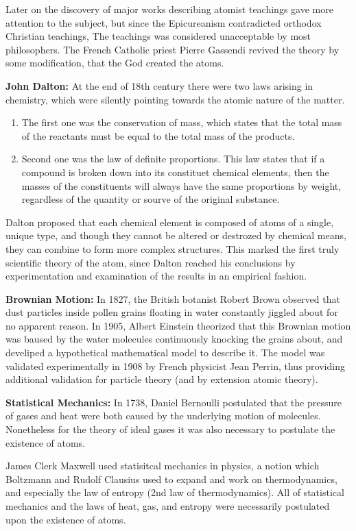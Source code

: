 \documentclass[10pt,a4paper]{article}
\newcounter{theo}
\begin{document}
Later on the discovery of major works describing atomist teachings gave more attention to the subject, but since the Epicureanism contradicted orthodox Christian teachings, The teachings was considered unacceptable by most philosophers. The French Catholic priest Pierre Gassendi revived the theory by some modification, that the God created the atoms.

\textbf{John Dalton:} At the end of 18th century there were two laws arising in chemistry, which were silently pointing towards the atomic nature of the matter. 

\begin{enumerate}
    \item The first one was the conservation of mass, which states that the total mass of the reactants must be equal to the total mass of the products.
    \item Second one was the law of definite proportions. This law states that if a compound is broken down into its constituet chemical elements, then the masses of the constituents will always have the same proportions by weight, regardless of the quantity or sourve of the original substance.
\end{enumerate}

Dalton proposed that each chemical element is composed of atoms of a single, unique type, and though they cannot be altered or destrozed by chemical means, they can combine to form more complex structures. This marked the first truly scientific theory of the atom, since Dalton reached his conclusions by experimentation and examination of the results in an empirical fashion.

\textbf{Brownian Motion:} In 1827, the British botanist Robert Brown observed that dust particles inside pollen grains floating in water constantly jiggled about for no apparent reason. In 1905, Albert Einstein theorized that this Brownian motion was baused by the water molecules continuously knocking the grains about, and develiped a hypothetical mathematical model to describe it. The model was validated experimentally in 1908 by French physicist Jean Perrin, thus providing additional validation for particle theory (and by extension atomic theory).

\textbf{Statistical Mechanics:} In 1738, Daniel Bernoulli postulated that the pressure of gases and heat were both caused by the underlying motion of molecules. Nonetheless for the theory of ideal gases it was also necessary to postulate the existence of atoms.

James Clerk Maxwell used statisitcal mechanics in physics, a notion which Boltzmann and Rudolf Clausius used to expand and work on thermodynamics, and especially the law of entropy (2nd law of thermodynamics). All of statistical mechanics and the laws of heat, gas, and entropy were necessarily postulated upon the existence of atoms.
\end{document}
